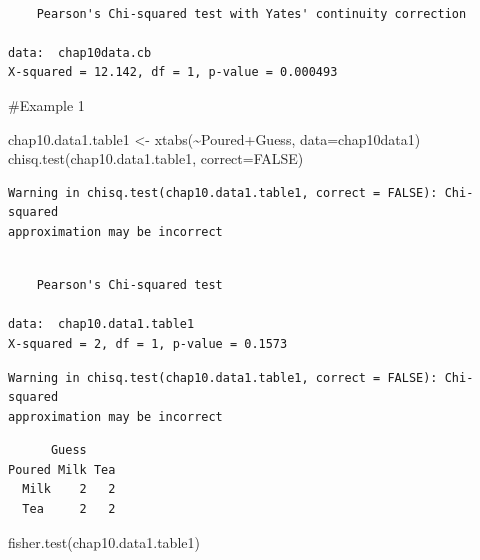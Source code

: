 \documentclass[
  letterpaper,
  DIV=11,
  numbers=noendperiod]{scrartcl}
\newenvironment{Shaded}{\begin{snugshade}}{\end{snugshade}}
\newcommand{\AttributeTok}[1]{\textcolor[rgb]{0.40,0.45,0.13}{#1}}
\newcommand{\ConstantTok}[1]{\textcolor[rgb]{0.56,0.35,0.01}{#1}}
\newcommand{\FunctionTok}[1]{\textcolor[rgb]{0.28,0.35,0.67}{#1}}
\newcommand{\NormalTok}[1]{\textcolor[rgb]{0.00,0.23,0.31}{#1}}
\newcommand{\OtherTok}[1]{\textcolor[rgb]{0.00,0.23,0.31}{#1}}
\newcommand{\SpecialCharTok}[1]{\textcolor[rgb]{0.37,0.37,0.37}{#1}}
\begin{document}
\begin{verbatim}

    Pearson's Chi-squared test with Yates' continuity correction

data:  chap10data.cb
X-squared = 12.142, df = 1, p-value = 0.000493
\end{verbatim}

\#Example 1

\begin{Shaded}
\begin{Highlighting}[]
\NormalTok{chap10.data1.table1 }\OtherTok{\textless{}{-}} \FunctionTok{xtabs}\NormalTok{(}\SpecialCharTok{\textasciitilde{}}\NormalTok{Poured}\SpecialCharTok{+}\NormalTok{Guess, }\AttributeTok{data=}\NormalTok{chap10data1)}
\FunctionTok{chisq.test}\NormalTok{(chap10.data1.table1, }\AttributeTok{correct=}\ConstantTok{FALSE}\NormalTok{)}
\end{Highlighting}
\end{Shaded}

\begin{verbatim}
Warning in chisq.test(chap10.data1.table1, correct = FALSE): Chi-squared
approximation may be incorrect
\end{verbatim}

\begin{verbatim}

    Pearson's Chi-squared test

data:  chap10.data1.table1
X-squared = 2, df = 1, p-value = 0.1573
\end{verbatim}

\begin{Shaded}
\end{Shaded}

\begin{verbatim}
Warning in chisq.test(chap10.data1.table1, correct = FALSE): Chi-squared
approximation may be incorrect
\end{verbatim}

\begin{verbatim}
      Guess
Poured Milk Tea
  Milk    2   2
  Tea     2   2
\end{verbatim}

\begin{Shaded}
\begin{Highlighting}[]
\FunctionTok{fisher.test}\NormalTok{(chap10.data1.table1)}
\end{Highlighting}
\end{Shaded}
\end{document}

